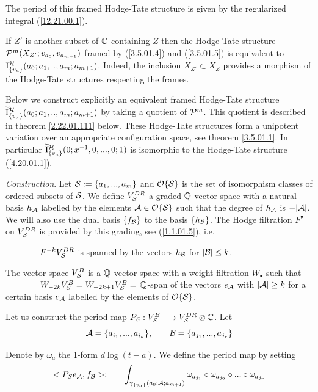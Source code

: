 \documentclass[10pt]{article}
\begin{document}
The period of this framed Hodge-Tate structure is given by the regularized 
integral (\ref{12.21.00.1}).

If $Z'$ is another subset of ${\mathbb C}$ containing $Z$ then 
the Hodge-Tate structure ${\cal P}^m(X_{Z'}; v_{a_0}, v_{a_{m+1}})$ framed 
by (\ref{3.5.01.4}) and (\ref{3.5.01.5}) is equivalent to 
${\rm I}^{\cal H}_{\{v_a\}}(a_0; a_1, .., a_m; a_{m+1})$. Indeed, the inclusion 
$X_{Z'} \subset X_Z$ provides a morphism of the Hodge-Tate structures 
respecting the frames. 

Below we construct explicitly an equivalent framed Hodge-Tate structure 
$\widetilde {\rm I}^{\cal H}_{\{v_a\}}(a_0; a_1, .., a_m; a_{m+1})$
by taking a quotient of  ${\cal P}^m$. This quotient is described in theorem 
\ref{2.22.01.111} below. These Hodge-Tate structures form a 
unipotent variation over an appropriate configuration space, 
see theorem \ref{3.5.01.1}. In particular 
$\widetilde {\rm I}^{\cal H}_{\{v_a\}}(0; x^{-1}, 0, ..., 0; 1)$ is isomorphic to the 
Hodge-Tate structure (\ref{4.20.01.1}).

{\it Construction}. 
Let ${\cal S}:= \{a_1, ..., a_m\}$ and 
 ${\cal O}\{{\cal S}\}$ is the set of  isomorphism classes of ordered subsets of 
${\cal S}$. We define  $V_{\cal S}^{DR}$ a graded ${\mathbb Q}$-vector space 
with a natural basis $h_{{\cal A}}$ 
labelled by the elements ${\cal A} \in {\cal O}\{{\cal S}\}$ 
such that the degree of $h_{{\cal A}}$ is $-|{\cal A}|$. We will also use 
the dual basis  $\{f_{\cal B}\}$ to the basis $\{h_{\cal B}\}$. The Hodge filtration 
$F^{\bullet}$ on $V_{\cal S}^{DR}$ is provided by this grading, 
see (\ref{1.1.01.5}), i.e.  

\vskip 3mm \noindent
$\qquad \qquad F^{-k}V^{DR}_{{\cal S}}$ is spanned by the vectors 
$h_{\cal B}$ for $|{\cal B}| \leq  k$. 
\vskip 3mm \noindent

 
The vector space $V_{\cal S}^{B}$ is 
a ${\mathbb Q}$-vector space with a weight filtration $W_{\bullet}$ such that 
\vskip 3mm \noindent
$\qquad \qquad W_{-2k} {V}^{B}_{{\cal S}} = W_{-2k+1} {V}^{B}_{{\cal S}} = $ ${\mathbb Q}$-span  of the vectors 
$e_{{\cal A}}$ with $|{\cal A}| \geq k$
\vskip 3mm \noindent
for a certain basis $e_{{\cal A}}$ labelled by the elements of ${\cal O}\{{\cal S}\}$. 


Let us construct the period map 
$
P_{\cal S}: {V}^{B}_{{\cal S}} \longrightarrow {V}^{DR}_{{\cal S}}\otimes {\mathbb C}
$.  
Let 
$$
{\cal A} = \{a_{i_1}, ..., a_{i_k}\},\qquad 
{\cal B} = \{a_{j_1},  ... ,  a_{j_r}\}
$$


 Denote by $\omega_a$ the 1-form $d\log (t-a)$. We define the period map by setting
\begin{equation} \label{1.1.00.2}
 <P_{\cal S} e_{{\cal A}}, f_{{\cal B}}> := \quad \int_{\gamma_{\{v_a\}}
(a_0; {\cal A}; a_{m+1})} 
\omega_{a_{j_1}} \circ \omega_{a_{j_2}} \circ  ... \circ 
\omega_{a_{j_r}} 
\end{equation}
\end{document}

